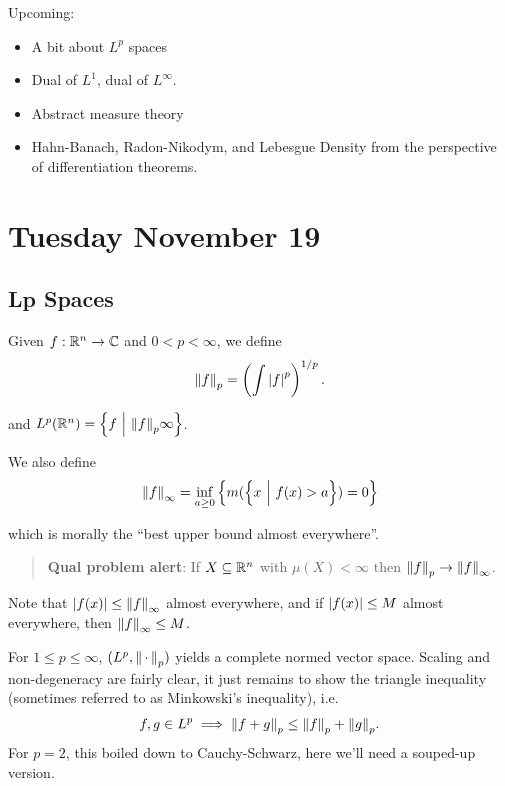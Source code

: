 Upcoming:

\begin{itemize}
\item
  A bit about \(L^p\) spaces
\item
  Dual of \(L^1\), dual of \(L^\infty\).
\item
  Abstract measure theory
\item
  Hahn-Banach, Radon-Nikodym, and Lebesgue Density from the perspective
  of differentiation theorems.
\end{itemize}

\hypertarget{tuesday-november-19}{%
\section{Tuesday November 19}\label{tuesday-november-19}}

\hypertarget{lp-spaces}{%
\subsection{Lp Spaces}\label{lp-spaces}}

Given \(f:{\mathbb{R}}^n \to {\mathbb{C}}\) and \(0 < p < \infty\), we define
\begin{align*}
{\left\lVert {f} \right\rVert}_p = \left( \int {\left\lvert {f} \right\rvert}^p \right)^{1/p}.
\end{align*}

and \(L^p({\mathbb{R}}^n) = \left\{{f {~\mathrel{\Big|}~} {\left\lVert {f} \right\rVert}_p \infty }\right\}\).

We also define
\begin{align*}
{\left\lVert {f} \right\rVert}_\infty = \inf_{a \geq 0} \left\{{ m(\left\{{x {~\mathrel{\Big|}~} f(x) > a}\right\}) = 0 }\right\}
\end{align*}

which is morally the ``best upper bound almost everywhere''.

\begin{quote}
\textbf{Qual problem alert}: If \(X \subseteq {\mathbb{R}}^n\) with
\(\mu(X) < \infty\) then \({\left\lVert {f} \right\rVert}_p \to {\left\lVert {f} \right\rVert}_\infty\).
\end{quote}

Note that \({\left\lvert {f(x)} \right\rvert} \leq {\left\lVert {f} \right\rVert}_\infty\) almost everywhere, and if
\({\left\lvert {f(x)} \right\rvert} \leq M\) almost everywhere, then
\({\left\lVert {f} \right\rVert}_\infty \leq M\).

For \(1 \leq p \leq \infty\), \(( L^p, {\left\lVert {{\,\cdot\,}} \right\rVert}_p)\) yields a
complete normed vector space. Scaling and non-degeneracy are fairly
clear, it just remains to show the triangle inequality (sometimes
referred to as Minkowski's inequality), i.e.~
\begin{align*}
f, g\in L^p \implies {\left\lVert {f+g} \right\rVert}_p \leq {\left\lVert {f} \right\rVert}_p + {\left\lVert {g} \right\rVert}_p.
\end{align*} For \(p=2\), this boiled down to Cauchy-Schwarz, here we'll
need a souped-up version.

